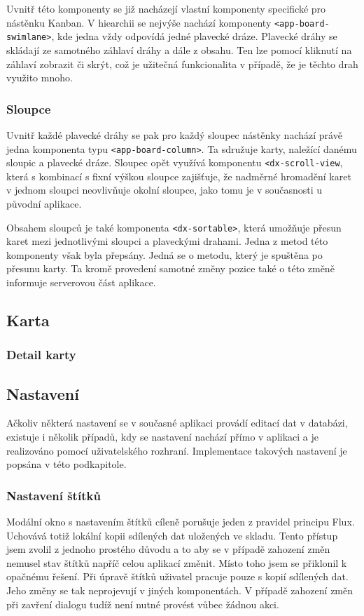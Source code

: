 Uvnitř této komponenty se již nacházejí vlastní komponenty specifické pro nástěnku Kanban. V hiearchii se nejvýše nachází komponenty \texttt{<app-board-swimlane>}, kde jedna vždy odpovídá jedné plavecké dráze. Plavecké dráhy se skládají ze samotného záhlaví dráhy a dále z obsahu. Ten lze pomocí kliknutí na záhlaví zobrazit či skrýt, což je užitečná funkcionalita v případě, že je těchto drah využito mnoho. 

\subsubsection*{Sloupce}

Uvnitř každé plavecké dráhy se pak pro každý sloupec nástěnky nachází právě jedna komponenta typu \texttt{<app-board-column>}. Ta sdružuje karty, naležící danému sloupic a plavecké dráze. Sloupec opět využívá komponentu \texttt{<dx-scroll-view}, která s kombinací s fixní výškou sloupce zajišťuje, že nadměrné hromadění karet v jednom sloupci neovlivňuje okolní sloupce, jako tomu je v současnosti u původní aplikace.

Obsahem sloupců je také komponenta \texttt{<dx-sortable>}, která umožňuje přesun karet mezi jednotlivými sloupci a plaveckými drahami. Jedna z metod této komponenty však byla přepsány. Jedná se o metodu, který je spuštěna po přesunu karty. Ta kromě provedení samotné změny pozice také o této změně informuje serverovou část aplikace. 

\subsection{Karta}

\blindtext

\subsubsection*{Detail karty}
\blindtext


\subsection{Nastavení}
Ačkoliv některá nastavení se v současné aplikaci provádí editací dat v databázi, existuje i několik případů, kdy se nastavení nachází přímo v aplikaci a je realizováno pomocí uživatelského rozhraní. Implementace takových nastavení je popsána v této podkapitole.

\subsubsection*{Nastavení štítků}
Modální okno s nastavením štítků cíleně porušuje jeden z pravidel principu Flux. Uchovává totiž lokální kopii sdílených dat uložených ve skladu. Tento přístup jsem zvolil z jednoho prostého důvodu a to aby se v případě zahození změn nemusel stav štítků napříč celou aplikací změnit. Místo toho jsem se přiklonil k opačnému řešení. Při úpravě štítků uživatel pracuje pouze s kopií sdílených dat. Jeho změny se tak neprojevují v jiných komponentách. V případě zahození změn při zavření dialogu tudíž není nutné provést vůbec žádnou akci. 

